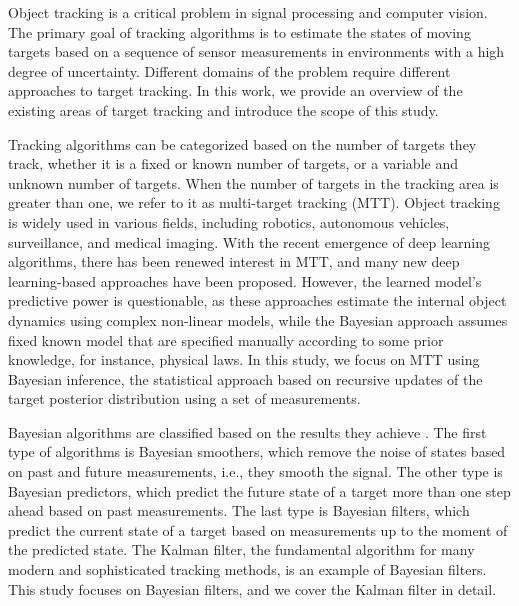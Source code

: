Object tracking is a critical problem in signal processing and computer vision. The primary goal of tracking algorithms is to estimate the states of moving targets based on a sequence of sensor measurements in environments with a high degree of uncertainty. Different domains of the problem require different approaches to target tracking. In this work, we provide an overview of the existing areas of target tracking and introduce the scope of this study.

Tracking algorithms can be categorized based on the number of targets they track, whether it is a fixed or known number of targets, or a variable and unknown number of targets. When the number of targets in the tracking area is greater than one, we refer to it as multi-target tracking (MTT). Object tracking is widely used in various fields, including robotics, autonomous vehicles, surveillance, and medical imaging. With the recent emergence of deep learning algorithms, there has been renewed interest in MTT, and many new deep learning-based approaches have been proposed. However, the learned model's predictive power is questionable, as these approaches estimate the internal object dynamics using complex non-linear models, while the Bayesian approach assumes fixed known model that are specified manually according to some prior knowledge, for instance, physical laws. In this study, we focus on MTT using Bayesian inference, the statistical approach based on recursive updates of the target posterior distribution using a set of measurements.

Bayesian algorithms are classified based on the results they achieve \cite[11]{sarkkaBayesianFilteringSmoothing2013}. The first type of algorithms is Bayesian smoothers, which remove the noise of states based on past and future measurements, i.e., they smooth the signal. The other type is Bayesian predictors, which predict the future state of a target more than one step ahead based on past measurements. The last type is Bayesian filters, which predict the current state of a target based on measurements up to the moment of the predicted state. The Kalman filter, the fundamental algorithm for many modern and sophisticated tracking methods, is an example of Bayesian filters. This study focuses on Bayesian filters, and we cover the Kalman filter in detail.

